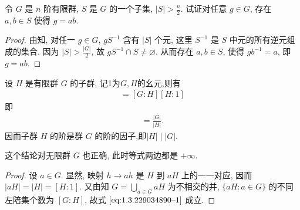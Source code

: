 \documentclass[../../main.tex]{subfiles}%
\begin{document}
\begin{example}
令 $G$ 是 $n$ 阶有限群, $S$ 是 $G$ 的一个子集, $|S| > \frac{n}{2}$. 试证对任意 $g \in G$, 存在 $a,b \in S$ 使得 $g = ab$.
\end{example}
\begin{proof}
由知, 对任一 $g \in G$, $gS^{-1}$ 含有 $|S|$ 个元, 这里 $S^{-1}$ 是 $S$ 中元的所有逆元组成的集合. 因为 $|S| > \frac{|G|}{2}$, 故 $gS^{-1} \cap S \neq \varnothing$. 从而存在 $a,b \in S$, 使得 $gb^{-1} = a$, 即 $g = ab$.
\end{proof}

\begin{theorem}[Lagrange定理]\label{theorem:抽象代数--Lagrange定理}
设 \( H \) 是有限群 \( G \) 的子群, 记1为$G,H$的幺元,则有
\begin{align}
[G:1] = [G:H][H:1] \label{eq:1.3.229034890--1}
\end{align}
即
\begin{align*}
[G:H]=\frac{|G|}{|H|}.
\end{align*}
因而子群 \( H \) 的阶是群 \( G \) 的阶的因子,即$|H|\mid |G|$.
\end{theorem}
\begin{remark}
这个结论对无限群 \( G \) 也正确, 此时等式两边都是 \( +\infty \).
\end{remark}
\begin{proof}
设 \( a \in G \). 显然, 映射 \( h \to ah \) 是 \( H \) 到 \( aH \) 上的一一对应, 因而 \( |aH| = |H| = [H:1] \). 又由知 \( G = \bigcup\limits_{a \in G} aH \) 为不相交的并, \( \{aH:a\in G\} \) 的不同左陪集个数为 \( [G:H] \), 故式 \(\eqref{eq:1.3.229034890--1}\) 成立.
\end{proof}
\end{document}
